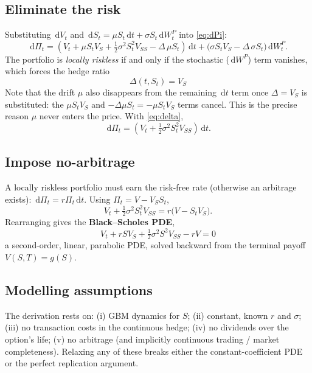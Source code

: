 \documentclass[11pt]{article}
\newcommand{\dd}{\,\mathrm{d}}
\begin{document}
\subsection{Eliminate the risk}
Substituting $\dd V_t$ and $\dd S_t = \mu S_t\dd t + \sigma S_t \dd W_t^P$ into \eqref{eq:dPi}:
\begin{equation}
\dd \Pi_t
= \left(V_t + \mu S_t V_S + \tfrac12\sigma^2 S_t^2 V_{SS} - \Delta\,\mu S_t\right)\dd t
+ \bigl(\sigma S_t V_S - \Delta\,\sigma S_t\bigr)\dd W_t^{P}.
\end{equation}
The portfolio is \emph{locally riskless} if and only if the stochastic ($\dd W^P$) term vanishes,
which forces the hedge ratio
\begin{equation}\label{eq:delta}
\boxed{\;\Delta(t,S_t) = V_S\;}
\end{equation}
Note that the drift $\mu$ also disappears from the remaining $\dd t$ term once $\Delta=V_S$ is
substituted: the $\mu S_t V_S$ and $-\Delta \mu S_t = -\mu S_t V_S$ terms cancel. This is the precise
reason $\mu$ never enters the price. With \eqref{eq:delta},
\begin{equation}
\dd \Pi_t = \left(V_t + \tfrac12\sigma^2 S_t^2 V_{SS}\right)\dd t.
\end{equation}

\subsection{Impose no-arbitrage}
A locally riskless portfolio must earn the risk-free rate (otherwise an arbitrage exists):
$\dd \Pi_t = r\Pi_t\dd t$. Using $\Pi_t = V - V_S S_t$,
\begin{equation}
V_t + \tfrac12\sigma^2 S_t^2 V_{SS} = r\bigl(V - S_t V_S\bigr).
\end{equation}
Rearranging gives the \textbf{Black--Scholes PDE},
\begin{equation}\label{eq:bspde}
\boxed{\;V_t + r S V_S + \tfrac12 \sigma^2 S^2 V_{SS} - r V = 0\;}
\end{equation}
a second-order, linear, parabolic PDE, solved backward from the terminal payoff $V(S,T)=g(S)$.

\subsection{Modelling assumptions}
The derivation rests on: (i) GBM dynamics for $S$; (ii) constant, known $r$ and $\sigma$;
(iii) no transaction costs in the continuous hedge; (iv) no dividends over the option's life;
(v) no arbitrage (and implicitly continuous trading / market completeness). Relaxing any of these
breaks either the constant-coefficient PDE or the perfect replication argument.
\end{document}
